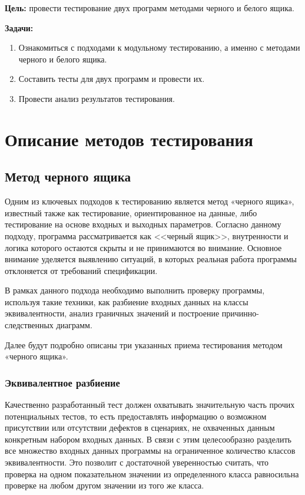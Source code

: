 \documentclass{article}[14pt]
\begin{document}
\noindent \textbf{Цель:} провести тестирование двух программ методами черного и белого ящика.

\noindent \textbf{Задачи:}

\begin{enumerate}
    \item Ознакомиться с подходами к модульному тестированию, а именно с методами черного и белого ящика.
    \item Составить тесты для двух программ и провести их.
    \item Провести анализ результатов тестирования.
\end{enumerate}

\pagebreak

\section{Описание методов тестирования}

\subsection{Метод черного ящика}

Одним из ключевых подходов к тестированию является метод «черного ящика», известный также как тестирование, 
ориентированное на данные, либо тестирование на основе входных и выходных параметров. Согласно данному подходу, 
программа рассматривается как <<черный ящик>>, внутренности и логика которого остаются скрыты и не 
принимаются во внимание. Основное внимание уделяется выявлению ситуаций, в которых реальная работа программы отклоняется 
от требований спецификации.

В рамках данного подхода необходимо выполнить проверку программы, используя такие техники, как разбиение входных данных на 
классы эквивалентности, анализ граничных значений и построение причинно-следственных диаграмм.

Далее будут подробно описаны три указанных приема тестирования методом «черного ящика».

\subsubsection{Эквивалентное разбиение}

Качественно разработанный тест должен охватывать значительную часть прочих потенциальных тестов, то есть предоставлять 
информацию о возможном присутствии или отсутствии дефектов в сценариях, не охваченных данным конкретным набором входных 
данных. В связи с этим целесообразно разделить все множество входных данных программы на ограниченное количество классов 
эквивалентности. Это позволит с достаточной уверенностью считать, что проверка на одном показательном значении из 
определенного класса равносильна проверке на любом другом значении из того же класса.
\end{document}
